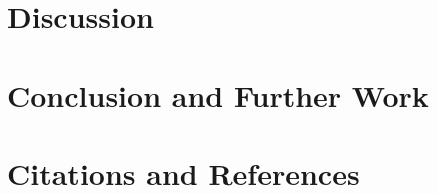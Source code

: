 \clearpage
\section{Discussion}

\clearpage
\section{Conclusion and Further Work}


\clearpage
\section{Citations and References}
\printbibliography

\clearpage
\begin{appendices}

\clearpage

\clearpage

\clearpage
\end{appendices}


